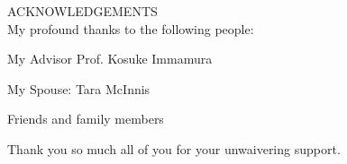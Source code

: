 ACKNOWLEDGEMENTS\\

My profound thanks to the following people:
\begin{itemized}
    \item My Advisor Prof. Kosuke Immamura
    \item My Spouse: Tara McInnis
    \item Friends and family members
\end{itemized}

Thank you so much all of you for your unwaivering support.

\newpage
